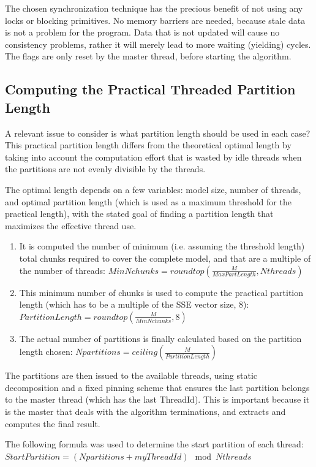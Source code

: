 The chosen synchronization technique has the precious benefit of not using any locks or blocking primitives.
No memory barriers are needed, because stale data is not a problem for the program. Data that is not updated will cause no consistency problems, rather it will merely lead to more waiting (yielding) cycles. The flags are only reset by the master thread, before starting the algorithm.

	

\subsection{Computing the Practical Threaded Partition Length}

A relevant issue to consider is what partition length should be used in each case? This practical partition length differs from the theoretical optimal length by taking into account the computation effort that is wasted by idle threads when the partitions are not evenly divisible by the threads.

The optimal length depends on a few variables: model size, number of threads, and optimal partition length (which is used as a maximum threshold for the practical length), with the stated goal of finding a partition length that maximizes the effective thread use.

\begin{enumerate}

\item It is computed the number of minimum (i.e. assuming the threshold length) total chunks required to cover the complete model, and that are a multiple of the number of threads:
	$MinNchunks = roundtop(\frac{M}{MaxPartLength}, Nthreads)$

\item This minimum number of chunks is used to compute the practical partition length (which has to be a multiple of the SSE vector size, 8):
	$ PartitionLength = roundtop(\frac{M}{MinNchunks}, 8) $

\item The actual number of partitions is finally calculated based on the partition length chosen:
	$Npartitions = ceiling(\frac{M}{PartitionLength} ) $
	
\end{enumerate}


The partitions are then issued to the available threads, using static decomposition and a fixed pinning scheme that ensures the last partition belongs to the master thread (which has the last ThreadId). This is important because it is the master that deals with the algorithm terminations, and extracts and computes the final result.

The following formula was used to determine the start partition of each thread:
	$StartPartition = (Npartitions + myThreadId) \mod Nthreads $

	


\clearpage

		
